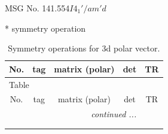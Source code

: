 \documentclass[fleqn,8pt]{jsarticle}
\begin{document}
\setcounter{MaxMatrixCols}{32}

\renewcommand{\tablename}{Table~}
\renewcommand{\figurename}{Figure~}
\begin{center}
\LARGE
MSG No. 141.554\quad$I4_{1}'/am'd$
\end{center}
* symmetry operation
\renewcommand{\arraystretch}{1.3}
\begin{longtable}{ccccc}
\caption{Symmetry operations for 3d polar vector.}
 \\
 \hline \hline
No. & tag & matrix (polar) & det & TR \\ \hline \endfirsthead

\multicolumn{4}{l}{\tablename\ \thetable{}} \\
 \hline \hline
No. & tag & matrix (polar) & det & TR \\ \hline \endhead

 \hline \hline
\multicolumn{4}{r}{\footnotesize\it continued ...} \\ \endfoot

 \hline \hline
\multicolumn{4}{r}{} \\ \endlastfoot


\end{longtable}
\end{document}
